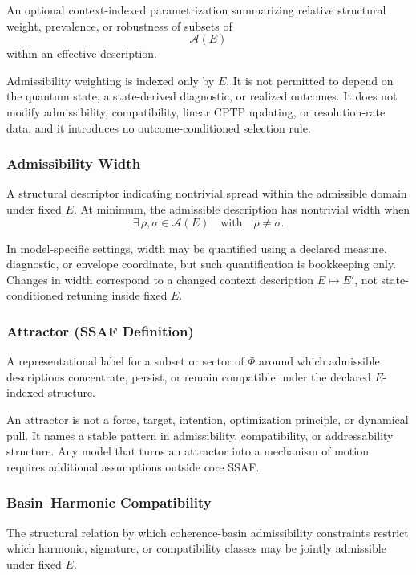 \documentclass[aps,prx,onecolumn,11pt]{revtex4-2}
\theoremstyle{plain}
\theoremstyle{definition}
\theoremstyle{remark}
\begin{document}
An optional context-indexed parametrization summarizing relative
structural weight, prevalence, or robustness of subsets of
\[
\mathcal A(E)
\]
within an effective description.

Admissibility weighting is indexed only by \(E\). It is not permitted
to depend on the quantum state, a state-derived diagnostic, or realized
outcomes. It does not modify admissibility, compatibility, linear CPTP
updating, or resolution-rate data, and it introduces no
outcome-conditioned selection rule.

\subsubsection*{Admissibility Width}

A structural descriptor indicating nontrivial spread within the
admissible domain under fixed \(E\). At minimum, the admissible
description has nontrivial width when
\[
\exists\,\rho,\sigma\in\mathcal A(E)
\quad\text{with}\quad
\rho\neq\sigma.
\]

In model-specific settings, width may be quantified using a declared
measure, diagnostic, or envelope coordinate, but such quantification is
bookkeeping only. Changes in width correspond to a changed context
description \(E\mapsto E'\), not state-conditioned retuning inside
fixed \(E\).

\subsubsection*{Attractor (SSAF Definition)}

A representational label for a subset or sector of \(\Phi\) around
which admissible descriptions concentrate, persist, or remain
compatible under the declared \(E\)-indexed structure.

An attractor is not a force, target, intention, optimization principle,
or dynamical pull. It names a stable pattern in admissibility,
compatibility, or addressability structure. Any model that turns an
attractor into a mechanism of motion requires additional assumptions
outside core SSAF.

\subsubsection*{Basin--Harmonic Compatibility}

The structural relation by which coherence-basin admissibility
constraints restrict which harmonic, signature, or compatibility
classes may be jointly admissible under fixed \(E\).
\end{document}
